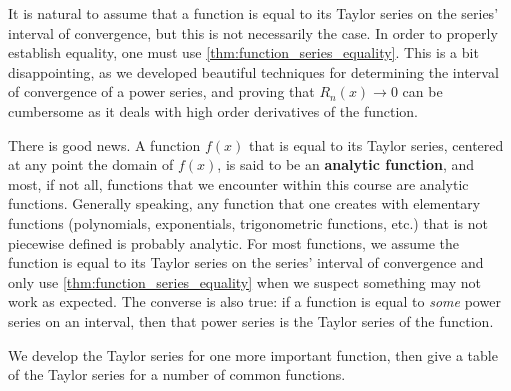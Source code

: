 It is natural to assume that a function is  equal to its Taylor series on the series' interval of convergence, but this is not necessarily the case. In order to properly establish equality, one must use \autoref{thm:function_series_equality}. This is a bit disappointing, as we developed beautiful techniques for determining the interval of convergence of a power series, and proving that $R_n(x)\to 0$ can be cumbersome as it deals with high order derivatives of the function.

There is good news. A function $f(x)$ that is equal to its Taylor series, centered at any point the domain of $f(x)$, is said to be an \textbf{analytic function}, and most, if not all, functions that we encounter within this course are analytic functions. Generally speaking, any function that one creates with elementary functions (polynomials, exponentials, trigonometric functions, etc.) that is not piecewise defined is probably analytic. For most functions, we assume the function is equal to its Taylor series on the series' interval of convergence and only use \autoref{thm:function_series_equality} when we suspect something may not work as expected.  The converse is also true: if a function is equal to \emph{some} power series on an interval, then that power series is the Taylor series of the function.

We develop the Taylor series for one more important function, then give a table of the Taylor series for a number of common functions.

